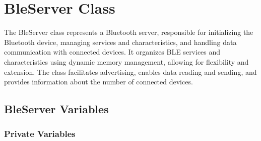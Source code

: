 \section{BleServer Class}
\label{sec:BleServer_Class}
The BleServer class represents a Bluetooth server, responsible for initializing the Bluetooth device, managing services and characteristics, and handling data communication with connected devices. 
It organizes BLE services and characteristics using dynamic memory management, allowing for flexibility and extension. 
The class facilitates advertising, enables data reading and sending, and provides information about the number of connected devices.

\subsection{BleServer Variables}
\label{sub:BleServer_Variables}

\subsubsection{Private Variables}

